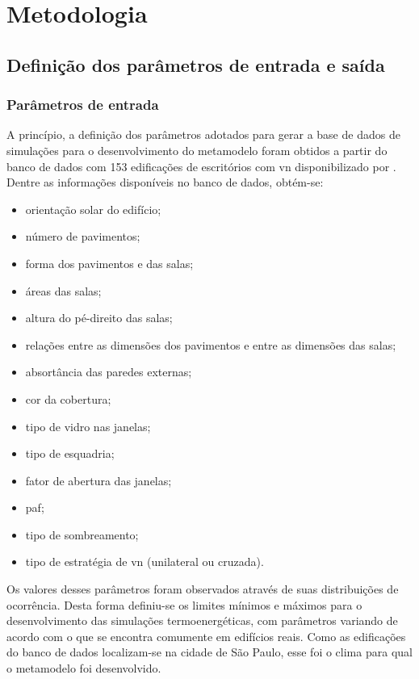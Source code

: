 \chapter{Metodologia}
\label{chapter:metodologia}

\section{Definição dos parâmetros de entrada e saída}

\subsection{Parâmetros de entrada}\label{subsec:par}

A princípio, a definição dos parâmetros adotados para gerar a base de dados de simulações para o desenvolvimento do metamodelo foram obtidos a partir do banco de dados com 153 edificações de escritórios com \acrfull{vn} disponibilizado por .  		
Dentre as informações  disponíveis no banco de dados, obtém-se:

\begin{itemize}
	\item orientação solar do edifício;
	\item número de pavimentos;
	\item forma dos pavimentos e das salas;
	\item áreas das salas;  %
	\item altura do pé-direito das salas;
	\item relações entre as dimensões dos pavimentos e entre as dimensões das salas;
	\item absortância das paredes externas; %
	\item cor da cobertura;
	\item tipo de vidro nas janelas;
	\item tipo de esquadria;
	\item fator de abertura das janelas;
	\item \acrfull{paf};  %
	\item tipo de sombreamento;  %
	\item tipo de estratégia de \acrlong{vn} (unilateral ou cruzada).
\end{itemize} 

Os valores desses parâmetros foram observados através de suas distribuições de ocorrência. Desta forma definiu-se os limites mínimos e máximos para o desenvolvimento das simulações termoenergéticas, com parâmetros variando de acordo com o que se encontra comumente em edifícios reais. Como as edificações do banco de dados localizam-se na cidade de São Paulo, esse foi o clima para qual o metamodelo foi desenvolvido.

